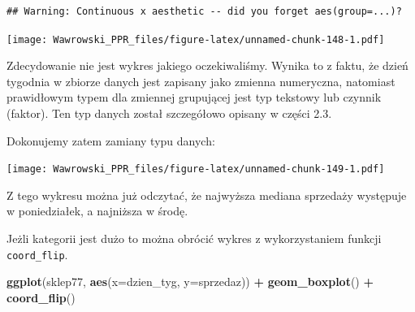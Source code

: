 \documentclass[]{book}
\newenvironment{Shaded}{\begin{snugshade}}{\end{snugshade}}
\newcommand{\KeywordTok}[1]{\textcolor[rgb]{0.13,0.29,0.53}{\textbf{#1}}}
\newcommand{\DataTypeTok}[1]{\textcolor[rgb]{0.13,0.29,0.53}{#1}}
\newcommand{\DecValTok}[1]{\textcolor[rgb]{0.00,0.00,0.81}{#1}}
\newcommand{\StringTok}[1]{\textcolor[rgb]{0.31,0.60,0.02}{#1}}
\newcommand{\OtherTok}[1]{\textcolor[rgb]{0.56,0.35,0.01}{#1}}
\newcommand{\OperatorTok}[1]{\textcolor[rgb]{0.81,0.36,0.00}{\textbf{#1}}}
\newcommand{\NormalTok}[1]{#1}
\begin{document}
\begin{verbatim}
## Warning: Continuous x aesthetic -- did you forget aes(group=...)?
\end{verbatim}

\texttt{[image: Wawrowski\_PPR\_files/figure-latex/unnamed-chunk-148-1.pdf]}

Zdecydowanie nie jest wykres jakiego oczekiwaliśmy. Wynika to z faktu,
że dzień tygodnia w zbiorze danych jest zapisany jako zmienna
numeryczna, natomiast prawidłowym typem dla zmiennej grupującej jest typ
tekstowy lub czynnik (faktor). Ten typ danych został szczegółowo opisany
w części 2.3.

Dokonujemy zatem zamiany typu danych:

\begin{Shaded}
\end{Shaded}

\texttt{[image: Wawrowski\_PPR\_files/figure-latex/unnamed-chunk-149-1.pdf]}

Z tego wykresu można już odczytać, że najwyższa mediana sprzedaży
występuje w poniedziałek, a najniższa w środę.

Jeżli kategorii jest dużo to można obrócić wykres z wykorzystaniem
funkcji \texttt{coord\_flip}.

\begin{Shaded}
\begin{Highlighting}[]
\KeywordTok{ggplot}\NormalTok{(sklep77, }\KeywordTok{aes}\NormalTok{(}\DataTypeTok{x=}\NormalTok{dzien_tyg, }\DataTypeTok{y=}\NormalTok{sprzedaz)) }\OperatorTok{+}
\StringTok{  }\KeywordTok{geom_boxplot}\NormalTok{() }\OperatorTok{+}
\StringTok{  }\KeywordTok{coord_flip}\NormalTok{()}
\end{Highlighting}
\end{Shaded}
\end{document}

